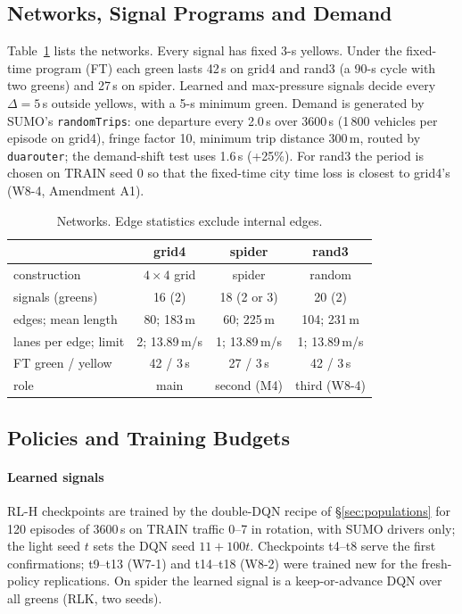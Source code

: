 \subsection{Networks, Signal Programs and Demand}
Table~\ref{tab:nets} lists the networks. Every signal has fixed 3-s yellows. Under the fixed-time program (FT) each green lasts 42\,s on
grid4 and rand3 (a 90-s cycle with two greens) and 27\,s on spider. Learned and max-pressure signals decide every $\Delta=5$\,s outside
yellows, with a 5-s minimum green. Demand is generated by SUMO's \texttt{randomTrips}: one departure every 2.0\,s over 3600\,s (1\,800
vehicles per episode on grid4), fringe factor 10, minimum trip distance 300\,m, routed by \texttt{duarouter}; the demand-shift test uses
1.6\,s (+25\%). For rand3 the period is chosen on TRAIN seed 0 so that the fixed-time city time loss is closest to grid4's (W8-4,
Amendment A1).
\begin{table}[t]\centering\footnotesize\setlength{\tabcolsep}{3pt}
\caption{Networks. Edge statistics exclude internal edges.}\label{tab:nets}\scriptsize
\begin{tabular}{@{}lccc@{}}\toprule
 & grid4 & spider & rand3\\\midrule
construction & $4\times4$ grid & spider & random\\
signals (greens) & 16 (2) & 18 (2 or 3) & 20 (2)\\
edges; mean length & 80; 183\,m & 60; 225\,m & 104; 231\,m\\
lanes per edge; limit & 2; 13.89\,m/s & 1; 13.89\,m/s & 1; 13.89\,m/s\\
FT green / yellow & 42 / 3\,s & 27 / 3\,s & 42 / 3\,s\\
role & main & second (M4) & third (W8-4)\\\bottomrule
\end{tabular}\end{table}

\subsection{Policies and Training Budgets}
\paragraph{Learned signals} RL-H checkpoints are trained by the double-DQN recipe of §\ref{sec:populations} for 120 episodes of 3600\,s on
TRAIN traffic 0--7 in rotation, with SUMO drivers only; the light seed $t$ sets the DQN seed $11+100t$. Checkpoints t4--t8 serve the first
confirmations; t9--t13 (W7-1) and t14--t18 (W8-2) were trained new for the fresh-policy replications. On spider the learned signal is a
keep-or-advance DQN over all greens (RLK, two seeds).
